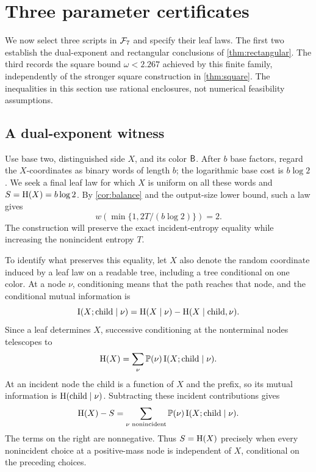 \section{Three parameter certificates}\label{sec:certificates}

We now select three scripts in \(\mathcal F_7\) and specify their leaf laws.
The first two establish the dual-exponent and rectangular conclusions
of \cref{thm:rectangular}.  The third records the square bound
\(\omega<2.267\) achieved by this finite family, independently of the
stronger square construction in \cref{thm:square}.
The inequalities in this section use rational enclosures, not numerical
feasibility assumptions.

\subsection{A dual-exponent witness}\label{subsec:dual}

Use base two, distinguished side \(X\), and its color \(\mathsf B\).
After \(b\) base factors, regard the \(X\)-coordinates as binary words
of length \(b\); the logarithmic base cost is \(b\log2\).
We seek a final leaf law for which \(X\) is uniform on all these words
and \(S=\mathrm H(X)=b\log2\).
By \cref{cor:balance} and the output-size lower bound, such a law gives
\[
 w\!\left(\min\{1,2T/(b\log2)\}\right)=2.
\]
The construction will preserve the exact incident-entropy equality
while increasing the nonincident entropy \(T\).

To identify what preserves this equality, let \(X\) also denote the
random coordinate induced by a leaf law on a readable tree, including
a tree conditional on one color.
At a node \(\nu\), conditioning means that the path reaches that node,
and the conditional mutual information is
\[
 \mathrm I(X;\text{child}\mid\nu)
 =\mathrm H(X\mid\nu)-\mathrm H(X\mid\text{child},\nu).
\]
Since a leaf determines \(X\), successive conditioning at the
nonterminal nodes telescopes to
\[
 \mathrm H(X)=\sum_\nu\mathbb P(\nu)\,
                  \mathrm I(X;\text{child}\mid\nu).
\]
At an incident node the child is a function of \(X\) and the prefix,
so its mutual information is \(\mathrm H(\text{child}\mid\nu)\).
Subtracting these incident contributions gives
\begin{equation}\label{eq:information-leakage}
 \mathrm H(X)-S
  =\sum_{\nu\text{ nonincident}}
       \mathbb P(\nu)\,\mathrm I(X;\text{child}\mid\nu).
\end{equation}
The terms on the right are nonnegative.  Thus \(S=\mathrm H(X)\) precisely
when every nonincident choice at a positive-mass node is independent
of \(X\), conditional on the preceding choices.

